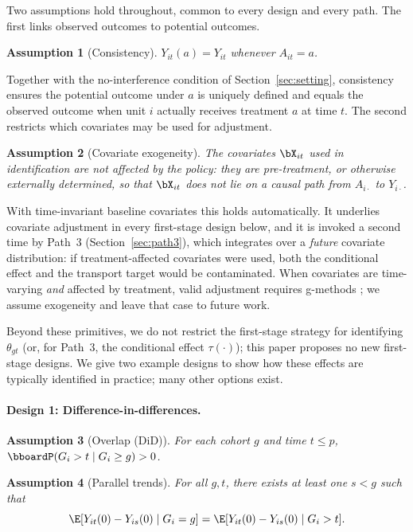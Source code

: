 \documentclass{article}
\renewcommand{\P}{\bboardP}
\newtheorem{assumption}{Assumption}
\begin{document}
Two assumptions hold throughout, common to every design and every path. The first links observed outcomes to potential outcomes.
\begin{assumption}[Consistency]
\label{assump:consistency}
$Y_{it}(a) = Y_{it}$ whenever $A_{it} = a$.
\end{assumption}
Together with the no-interference condition of Section~\ref{sec:setting}, consistency ensures the potential outcome under $a$ is uniquely defined and equals the observed outcome when unit $i$ actually receives treatment $a$ at time $t$. The second restricts which covariates may be used for adjustment.
\begin{assumption}[Covariate exogeneity]
\label{assump:cov-exog}
The covariates $\bX_{it}$ used in identification are not affected by the policy: they are pre-treatment, or otherwise externally determined, so that $\bX_{it}$ does not lie on a causal path from $A_{i\cdot}$ to $Y_{i\cdot}$.
\end{assumption}
With time-invariant baseline covariates this holds automatically. It underlies covariate adjustment in every first-stage design below, and it is invoked a second time by Path~3 (Section~\ref{sec:path3}), which integrates over a \emph{future} covariate distribution: if treatment-affected covariates were used, both the conditional effect and the transport target would be contaminated. When covariates are time-varying \emph{and} affected by treatment, valid adjustment requires g-methods \citep{robinsNewApproachCausal1986}; we assume exogeneity and leave that case to future work.

Beyond these primitives, we do not restrict the first-stage strategy for identifying $\theta_{gt}$ (or, for Path~3, the conditional effect $\tau(\cdot)$); this paper proposes no new first-stage designs. We give two example designs to show how these effects are typically identified in practice; many other options exist.

\paragraph{Design 1: Difference-in-differences.}

\begin{assumption}[Overlap (DiD)]
\label{assump:overlap-did}
For each cohort $g$ and time $t \leq p$, $\P(G_i > t \mid G_i \geq g) > 0$.
\end{assumption}

\begin{assumption}[Parallel trends]
\label{assump:parallel-trends}
For all $g, t$, there exists at least one $s < g$ such that
\[
\E[Y_{it}(0) - Y_{is}(0) \mid G_i = g] = \E[Y_{it}(0) - Y_{is}(0) \mid G_i > t].
\]
\end{assumption}
\end{document}
